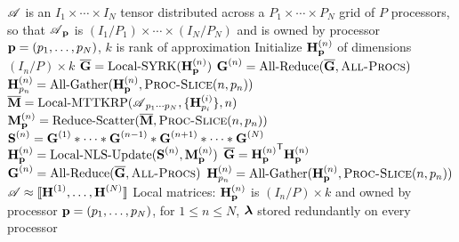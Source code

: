 \begin{algorithm}
\caption{$\CP = \text{Par-NNCP}(\TA,k)$}
\label{alg:Par-NNCP-short}
\begin{algorithmic}[1]
\Require $\TA$ is an $I_1\times \cdots \times I_N$ tensor distributed across a $P_1\times \cdots \times P_N$ grid of $P$ processors, so that $\TA_{\V{p}}$ is $(I_1/P_1)\times \cdots \times (I_N/P_N)$ and is owned by processor $\V{p}=(p_1,\dots,p_N)$, $k$ is rank of approximation
	\State Initialize $\Mn{H}{n}_{\V{p}}$ of dimensions $(I_n/P)\times k$ 
	\State $\M[\overline]{G} = \text{Local-SYRK}(\Mn{H}{n}_{\V{p}})$
	\State $\Mn{G}{n} = \text{All-Reduce}(\M[\overline]{G},\textsc{All-Procs})$
	\State $\Mn{H}{n}_{p_n} = \text{All-Gather}(\Mn{H}{n}_{\V{p}},\textsc{Proc-Slice}(n,\VE{p}{n}))$
\EndFor
\State {}
	\label{line:while}
	\State {}
		\label{line:for}
		\State {}
		\State $\M[\overline]{M} = \text{Local-MTTKRP}(\TA_{p_1\cdots p_N},\{\Mn{H}{i}_{p_i}\},n)$
			\label{line:locMTTKRP}
		\State $\Mn{M}{n}_{\V{p}} = \text{Reduce-Scatter}(\M[\overline]{M},\textsc{Proc-Slice}(n,\VE{p}{n}))$ 
			\label{line:reduce-scatter}
		\State $\Mn{S}{n} = \Mn{G}{1} \Hada \cdots \Hada \Mn{G}{n-1} \Hada \Mn{G}{n+1} \Hada \cdots \Hada \Mn{G}{N}$
			\label{line:hadamard}
		\State $\Mn{H}{n}_{\V{p}} = \text{Local-NLS-Update}(\Mn{S}{n},\Mn{M}{n}_{\V{p}})$
			\label{line:locNLS}
		\State {}
		\State $\M[\overline]{G} = {\Mn{H}{n}_{\V{p}}}^\Tra\Mn{H}{n}_{\V{p}}$
			\label{line:locSYRK}
		\State $\Mn{G}{n} = \text{All-Reduce}(\M[\overline]{G},\textsc{All-Procs})$
			\label{line:all-reduce}
		\State $\Mn{H}{n}_{p_n} = \text{All-Gather}(\Mn{H}{n}_{\V{p}},\textsc{Proc-Slice}(n,\VE{p}{n}))$
			\label{line:all-gather}
	\EndFor 
		\label{line:endfor}
\EndWhile
	\label{line:endwhile}
\Ensure $\TA \approx \CP$
\Ensure Local matrices: $\Mn{H}{n}_{\V{p}}$ is $(I_n/P)\times k$ and owned by processor $\V{p}=(p_1,\dots,p_N)$, for $1\leq n \leq N$, $\V{\lambda}$ stored redundantly on every processor
\end{algorithmic}
\end{algorithm}

